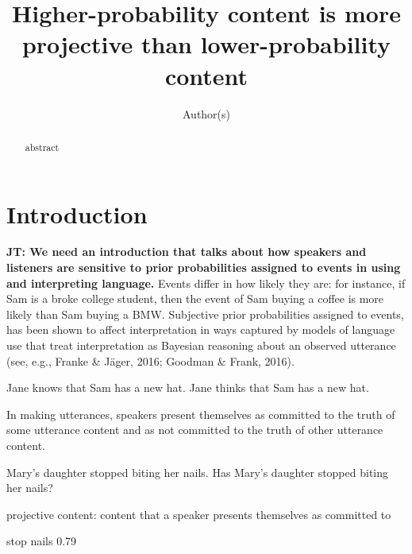 \documentclass[11pt,fleqn]{article}
\title{Higher-probability content is more projective than lower-probability content}
\author{Author(s)}
\newcommand{\6}{\mbox{$[\hspace*{-.6mm}[$}}
\newcommand{\9}{\mbox{$]\hspace*{-.6mm}]$}}
\newcommand{\jt}[1]{\textbf{\color{blue}JT: #1}}
\begin{document}

\maketitle

\vspace*{-1cm}

\begin{abstract}

abstract

\end{abstract}

			
\section{Introduction}\label{s1}

\jt{We need an introduction that talks about how speakers and listeners are sensitive to prior probabilities assigned to events in using and interpreting language.} Events differ in how likely they are: for instance, if Sam is a broke college student, then the event of Sam buying a coffee is more likely than Sam buying a BMW. Subjective prior probabilities assigned to events, has been shown to affect interpretation in ways captured by models of language use that treat interpretation as Bayesian reasoning about an observed utterance (see, e.g., Franke \& J\"ager, 2016; Goodman \& Frank, 2016).



\begin{exe}
\ex 
\begin{xlist}
\ex Jane knows that Sam has a new hat.
\ex Jane thinks that Sam has a new hat.
\end{xlist}
\end{exe}

In making utterances, speakers present themselves as committed to the truth of some utterance content and as not committed to the truth of other utterance content.

\begin{exe}
\ex
\begin{xlist}
\ex Mary's daughter stopped biting her nails.
\ex Has Mary's daughter stopped biting her nails?
\end{xlist}
\end{exe}

projective content: content that a speaker presents themselves as committed to

stop nails 0.79
\end{document}
